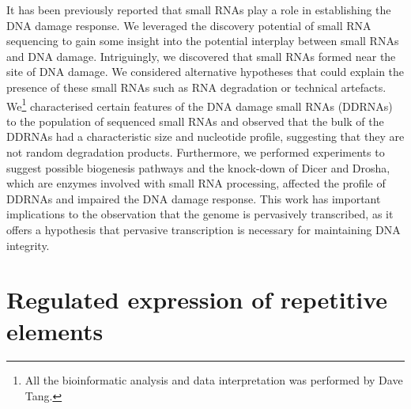 \documentclass[10pt,a4paper]{report}
\begin{document}
It has been previously reported that small RNAs play a role in establishing the DNA damage response\cite{pmid19444217}. We leveraged the discovery potential of small RNA sequencing to gain some insight into the potential interplay between small RNAs and DNA damage. Intriguingly, we discovered that small RNAs formed near the site of DNA damage. We considered alternative hypotheses that could explain the presence of these small RNAs such as RNA degradation or technical artefacts. We\footnote{All the bioinformatic analysis and data interpretation was performed by Dave Tang.} characterised certain features of the DNA damage small RNAs (DDRNAs) to the population of sequenced small RNAs and observed that the bulk of the DDRNAs had a characteristic size and nucleotide profile, suggesting that they are not random degradation products. Furthermore, we performed experiments to suggest possible biogenesis pathways and the knock-down of Dicer and Drosha, which are enzymes involved with small RNA processing, affected the profile of DDRNAs and impaired the DNA damage response. This work has important implications to the observation that the genome is pervasively transcribed, as it offers a hypothesis that pervasive transcription is necessary for maintaining DNA integrity.





%
%

%
%

\chapter{Regulated expression of repetitive elements}\label{repeat}

\end{document}
